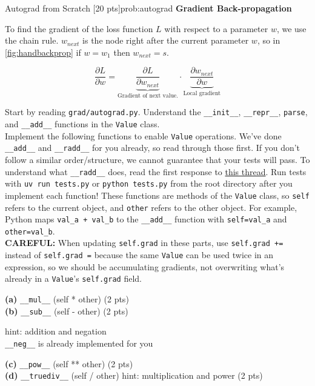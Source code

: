 \begin{problem}{Autograd from Scratch \hfill {[20 pts]}}{prob:autograd}
\vspace{10px}
\textbf{Gradient Back-propagation}

To find the gradient of the loss function $L$ with respect to a parameter $w$,
we use the chain rule. $w_{next}$ is the node right after the current parameter
$w$, so in \cref{fig:handbackprop} if $w=w_1$ then $w_{next}=s$.

\[
\frac{\partial L}{\partial w} = 
\underbrace{\frac{\partial L}{\partial w_{next}}}_{\text{Gradient of next value.}} \cdot 
\underbrace{\frac{\partial w_{next}}{\partial w}}_{\text{Local gradient}}
\]


Start by reading \verb|grad/autograd.py|. Understand the \verb|__init__|,
\verb|__repr__|, \verb|parse|, and \verb|__add__| functions in the \verb|Value|
class.\\

Implement the following functions to enable \texttt{Value} operations. We've
done \verb|__add__| and \verb|__radd__| for you already, so read through those
first. If you don't follow a similar order/structure, we cannot guarantee that
your tests will pass. To understand what \verb|__radd__| does, read the first
response to
\href{https://www.reddit.com/r/learnpython/comments/3cvgpi/can_someone_explain_radd_to_me_in_simple_terms_i/}{this
thread}. Run tests with \verb|uv run tests.py| or \verb|python tests.py| from
the root directory after you implement each function! These functions are
methods of the \verb|Value| class, so \verb|self| refers to the current object,
and \verb|other| refers to the other object. For example, Python maps
\verb|val_a + val_b| to the \verb|__add__| function with \verb|self=val_a| and
\verb|other=val_b|.\\

\textbf{CAREFUL:} When updating \verb|self.grad| in these parts, use
\verb|self.grad +=| instead of \verb|self.grad =| because the same \verb|Value|
can be used twice in an expression, so we should be accumulating gradients, not
overwriting what's already in a \verb|Value|'s \verb|self.grad| field.

\begin{adjustwidth}{2em}{2em}
    \textbf{(a)} \verb|__mul__| (self * other) \hfill (2 pts)\\
    \textbf{(b)} \verb|__sub__| (self - other) \hfill (2 pts)\\
    \begin{adjustwidth}{2em}{2em}
    hint: addition and negation\\
    \verb|__neg__| is already implemented for you\\
    \end{adjustwidth}
    \textbf{(c)} \verb|__pow__| (self ** other) \hfill (2 pts)\\
    \textbf{(d)} \verb|__truediv__| (self / other) hint: multiplication and
    power \hfill (2 pts)\\
\end{adjustwidth}


\end{problem}

